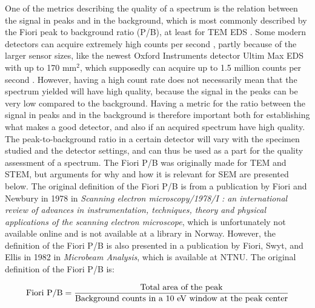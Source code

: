 One of the metrics describing the quality of a spectrum is the relation between the signal in peaks and in the background, which is most commonly described by the Fiori peak to background ratio (P/B), at least for TEM EDS \cite{carter2016transmission}.
Some modern detectors can acquire extremely high counts per second , partly because of the larger sensor sizes, like the newest Oxford Instruments detector Ultim Max EDS with up to 170 mm$^2$, which supposedly can acquire up to 1.5 million counts per second .
However, having a high count rate does not necessarily mean that the spectrum yielded will have high quality, because the signal in the peaks can be very low compared to the background.
Having a metric for the ratio between the signal in peaks and in the background is therefore important both for establishing what makes a good detector, and also if an acquired spectrum have high quality.
The peak-to-background ratio in a certain detector will vary with the specimen studied and the detector settings, and can thus be used as a part for the quality assessment of a spectrum.
The Fiori P/B was originally made for TEM and STEM, but arguments for why and how it is relevant for SEM are presented below.
The original definition of the Fiori P/B is from a publication by Fiori and Newbury in 1978 in \emph{Scanning electron microscopy/1978/I : an international review of advances in instrumentation, techniques, theory and physical applications of the scanning electron microscope}, which is unfortunately not available online and is not available at a library in Norway.
However, the definition of the Fiori P/B is also presented in a publication by Fiori, Swyt, and Ellis in 1982 \cite{fiori_peak_background_1982} in \emph{Microbeam Analysis}, which is available at NTNU.
The original definition of the Fiori P/B is:

\begin{equation}
    \label{eq:fiori_pb}
    \textnormal{Fiori P/B} = \frac{\textnormal{Total area of the peak}}{\textnormal{Background counts in a 10 eV window at the peak center}}
\end{equation}




